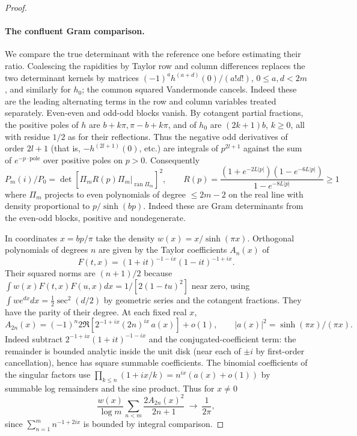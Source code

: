 \begin{proof}
\paragraph{The confluent Gram comparison.}
We compare the true determinant with the reference one before estimating
their ratio. Coalescing the rapidities by Taylor row and column
differences replaces the two determinant kernels by matrices
\((-1)^a h^{(a+d)}(0)/(a!d!)\), \(0\le a,d<2m\), and similarly
for \(h_0\); the common squared Vandermonde cancels. Indeed these are the leading alternating terms in the row and column variables treated separately. Even-even and odd-odd blocks vanish. By cotangent partial fractions, the positive poles of \(h\) are \(b+k\pi,\pi-b+k\pi\), and of \(h_0\) are \((2k+1)b\), \(k\ge0\), all with residue \(1/2\) as for their reflections. Thus the negative odd derivatives of order \(2l+1\) (that is, \(-h^{(2l+1)}(0)\), etc.) are integrals of \(p^{2l+1}\) against the sum of \(e^{-p\cdot\text{pole}}\) over positive poles on \(p>0\). Consequently
\[
 P_m(i)/P_0=\det\!\left[\Pi_m R(p)\Pi_m\big|_{\operatorname{ran}\Pi_m}\right]^2,
 \qquad R(p)=\frac{(1+e^{-2L|p|})(1-e^{-6L|p|})}{1-e^{-8L|p|}}\ge1
\]
where \(\Pi_m\) projects to even polynomials of degree \(\le2m-2\) on the real line with density proportional to \(p/\sinh(bp)\). Indeed these are Gram determinants from the even-odd blocks, positive and nondegenerate.

In coordinates \(x=bp/\pi\) take the density \(w(x)=x/\sinh(\pi x)\). Orthogonal polynomials of degrees \(n\) are given by the Taylor coefficients \(A_n(x)\) of
\[
 F(t,x)=(1+it)^{-1-i x}(1-it)^{-1+i x}.
\]
Their squared norms are \((n+1)/2\) because \(\int w(x)F(t,x)F(u,x)dx=1/[2(1-tu)^2]\) near zero, using \(\int w e^{d x}dx=\tfrac12\sec^2(d/2)\) by geometric series and the cotangent fractions. They have the parity of their degree. At each fixed real \(x\),
\[
 A_{2n}(x)=(-1)^n 2\Re\left[2^{-1+i x}(2n)^{i x}\,a(x)\right]+o(1),\qquad
 |a(x)|^2=\sinh(\pi x)/(\pi x).
\]
Indeed subtract \(2^{-1+i x}(1+it)^{-1-i x}\) and the conjugated-coefficient term: the remainder is bounded analytic inside the unit disk (near each of \(\pm i\) by first-order cancellation), hence has square summable coefficients. The binomial coefficients of the singular factors use \(\prod_{k\le n}(1+i x/k)=n^{i x}(a(x)+o(1))\) by summable log remainders and the sine product. Thus for \(x\ne0\)
\[
 \frac{w(x)}{\log m}\sum_{n<m}\frac{2 A_{2n}(x)^2}{2n+1}\ \longrightarrow\ \frac{1}{2\pi},
\]
since \(\sum_{n=1}^m n^{-1+2ix}\) is bounded by integral comparison.


\end{proof}
